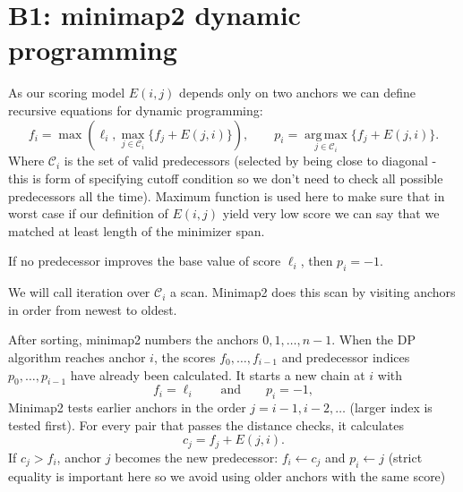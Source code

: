 \section{B1: minimap2 dynamic programming}
\label{sec:chaining-b1}

As our scoring model $E(i,j)$ depends only on two anchors we can define recursive equations for dynamic programming:
\begin{equation}
 f_i=\max\!\left(
   \ell_i,
   \max_{j\in\mathcal{C}_i}\{f_j+E(j,i)\}
 \right),
 \qquad
 p_i=\operatorname*{arg\,max}_{j\in\mathcal{C}_i}\{f_j+E(j,i)\}.
\label{eq:chaining-b1-recurrence}
\end{equation}
Where $\mathcal{C}_i$ is the set of valid predecessors (selected by being close to diagonal - this is form of specifying cutoff condition so we don't need to check all possible predecessors all the time).
Maximum function is used here to make sure that in worst case if our definition of $E(i,j)$ yield very low score we can say that we matched at least length of the minimizer span.

If no predecessor improves the base value of score \(\ell_i\), then
\(p_i=-1\).

We will call iteration over $\mathcal{C}_i$ a scan. Minimap2 does this scan by visiting anchors in order from newest to oldest.

After sorting, minimap2 numbers the anchors \(0,1,\ldots,n-1\). When the DP algorithm
reaches anchor \(i\), the scores \(f_0,\ldots,f_{i-1}\) and predecessor
indices \(p_0,\ldots,p_{i-1}\) have already been calculated. It starts a new
chain at \(i\) with
\[
  f_i=\ell_i \qquad\text{and}\qquad p_i=-1,
\]
Minimap2 tests earlier anchors in the order \(j=i-1,i-2,\ldots\) (larger
index is tested first). For every pair that passes the distance checks, it
calculates
\[
  c_j=f_j+E(j,i).
\]
If \(c_j>f_i\), anchor \(j\) becomes the new predecessor:
\(f_i\gets c_j\) and \(p_i\gets j\) (strict equality is important here so we avoid using older anchors with the same score)

